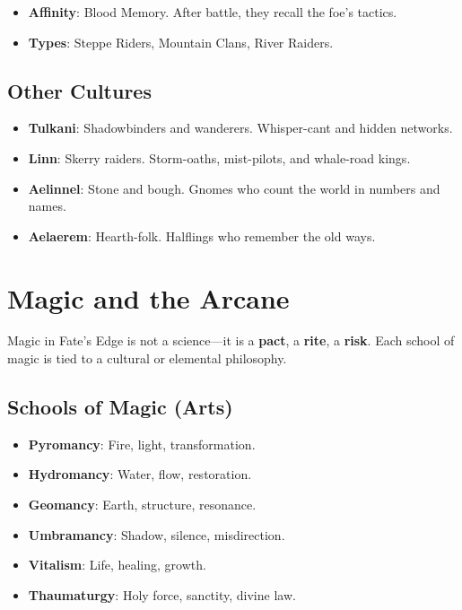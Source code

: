 \begin{itemize}
    \item \textbf{Affinity}: Blood Memory. After battle, they recall the foe’s tactics.
    \item \textbf{Types}: Steppe Riders, Mountain Clans, River Raiders.
\end{itemize}

\subsection*{Other Cultures}

\begin{itemize}
    \item \textbf{Tulkani}: Shadowbinders and wanderers. Whisper-cant and hidden networks.
    \item \textbf{Linn}: Skerry raiders. Storm-oaths, mist-pilots, and whale-road kings.
    \item \textbf{Aelinnel}: Stone and bough. Gnomes who count the world in numbers and names.
    \item \textbf{Aelaerem}: Hearth-folk. Halflings who remember the old ways.
\end{itemize}

\section*{Magic and the Arcane}

Magic in Fate’s Edge is not a science—it is a \textbf{pact}, a \textbf{rite}, a \textbf{risk}. Each school of magic is tied to a cultural or elemental philosophy.

\subsection*{Schools of Magic (Arts)}

\begin{itemize}
    \item \textbf{Pyromancy}: Fire, light, transformation.
    \item \textbf{Hydromancy}: Water, flow, restoration.
    \item \textbf{Geomancy}: Earth, structure, resonance.
    \item \textbf{Umbramancy}: Shadow, silence, misdirection.
    \item \textbf{Vitalism}: Life, healing, growth.
    \item \textbf{Thaumaturgy}: Holy force, sanctity, divine law.
\end{itemize}

